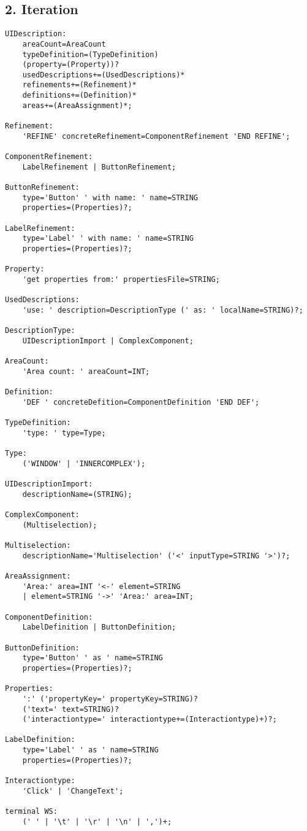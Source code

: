 \subsection*{2. Iteration}
\begin{lstlisting}
UIDescription:
	areaCount=AreaCount
	typeDefinition=(TypeDefinition)
	(property=(Property))?
	usedDescriptions+=(UsedDescriptions)*
	refinements+=(Refinement)*
	definitions+=(Definition)*
	areas+=(AreaAssignment)*;

Refinement:
	'REFINE' concreteRefinement=ComponentRefinement 'END REFINE';

ComponentRefinement:
	LabelRefinement | ButtonRefinement;

ButtonRefinement:
	type='Button' ' with name: ' name=STRING
	properties=(Properties)?;

LabelRefinement:
	type='Label' ' with name: ' name=STRING
	properties=(Properties)?;

Property:
	'get properties from:' propertiesFile=STRING;

UsedDescriptions:
	'use: ' description=DescriptionType (' as: ' localName=STRING)?;

DescriptionType:
	UIDescriptionImport | ComplexComponent;

AreaCount:
	'Area count: ' areaCount=INT;

Definition:
	'DEF ' concreteDefition=ComponentDefinition 'END DEF';

TypeDefinition:
	'type: ' type=Type;

Type:
	('WINDOW' | 'INNERCOMPLEX');

UIDescriptionImport:
	descriptionName=(STRING);

ComplexComponent:
	(Multiselection);

Multiselection:
	descriptionName='Multiselection' ('<' inputType=STRING '>')?;

AreaAssignment:
	'Area:' area=INT '<-' element=STRING
	| element=STRING '->' 'Area:' area=INT;

ComponentDefinition:
	LabelDefinition | ButtonDefinition;

ButtonDefinition:
	type='Button' ' as ' name=STRING
	properties=(Properties)?;

Properties:
	':' ('propertyKey=' propertyKey=STRING)?
	('text=' text=STRING)?
	('interactiontype=' interactiontype+=(Interactiontype)+)?;

LabelDefinition:
	type='Label' ' as ' name=STRING
	properties=(Properties)?;

Interactiontype:
	'Click' | 'ChangeText';

terminal WS:
	(' ' | '\t' | '\r' | '\n' | ',')+;

\end{lstlisting}
